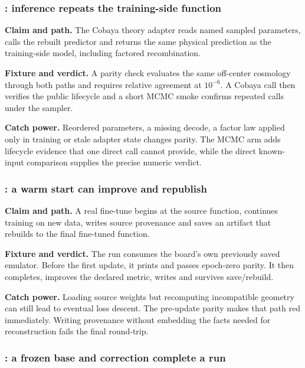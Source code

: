 \subsubsection{: inference repeats the training-side function}

\textbf{Claim and path.}  The Cobaya theory adapter reads named sampled
parameters, calls the rebuilt predictor and returns the same physical
prediction as the training-side model, including factored recombination.

\textbf{Fixture and verdict.}  A parity check evaluates the same off-center
cosmology through both paths and requires relative agreement at
\(10^{-6}\).  A Cobaya  call then verifies the public lifecycle
and a short MCMC smoke confirms repeated calls under the sampler.

\textbf{Catch power.}  Reordered parameters, a missing decode, a factor law
applied only in training or stale adapter state changes parity.  The MCMC arm
adds lifecycle evidence that one direct call cannot provide, while the direct
known-input comparison supplies the precise numeric verdict.

\subsubsection{: a warm start can improve and republish}

\textbf{Claim and path.}  A real fine-tune begins at the source function,
continues training on new data, writes source provenance and saves an
artifact that rebuilds to the final fine-tuned function.

\textbf{Fixture and verdict.}  The run consumes the board's own previously
saved emulator.  Before the first update, it prints and passes epoch-zero
parity.  It then completes, improves the declared metric, writes
 and survives save/rebuild.

\textbf{Catch power.}  Loading source weights but recomputing incompatible
geometry can still lead to eventual loss descent.  The pre-update parity makes
that path red immediately.  Writing provenance without embedding the facts
needed for reconstruction fails the final round-trip.

\subsubsection{: a frozen base and correction complete a run}


